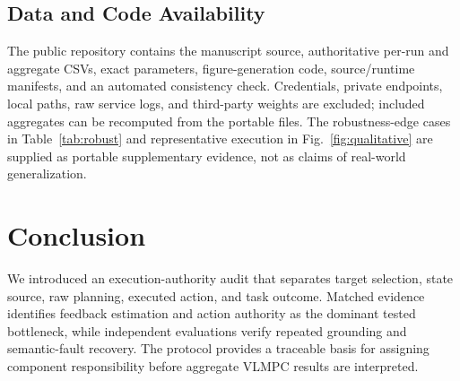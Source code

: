 \documentclass[conference]{IEEEtran}
\begin{document}
\subsection{Data and Code Availability}
The public repository contains the manuscript source, authoritative per-run and aggregate CSVs, exact parameters, figure-generation code, source/runtime manifests, and an automated consistency check. Credentials, private endpoints, local paths, raw service logs, and third-party weights are excluded; included aggregates can be recomputed from the portable files. The robustness-edge cases in Table~\ref{tab:robust} and representative execution in Fig.~\ref{fig:qualitative} are supplied as portable supplementary evidence, not as claims of real-world generalization.

\section{Conclusion}
We introduced an execution-authority audit that separates target selection, state source, raw planning, executed action, and task outcome. Matched evidence identifies feedback estimation and action authority as the dominant tested bottleneck, while independent evaluations verify repeated grounding and semantic-fault recovery. The protocol provides a traceable basis for assigning component responsibility before aggregate VLMPC results are interpreted.



\end{document}
